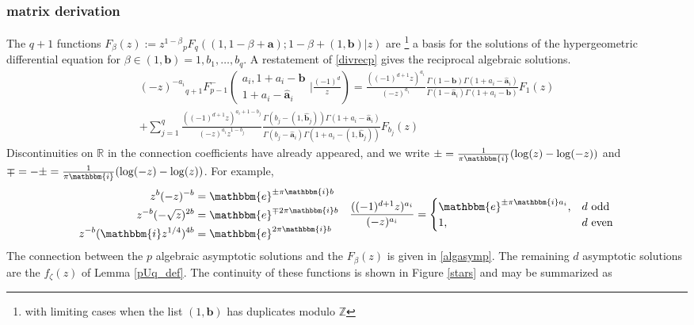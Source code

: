 \documentclass[12pt]{article}
\newcommand{\ee}[0] {\mathbbm{e}}
\newcommand{\ii}[0] {\mathbbm{i}}
\numberwithin{equation}{section}
\newcommand{\FFe}[7] {{}_{#1}^{\,}{#2}_{#3}^{#4} \left( \begin{array}{c} #5 \\ #6 \end{array} \Big| {#7} \right)}
\newcommand{\bfa}[0] {\mathbf{a}}
\newcommand{\bfb}[0] {\mathbf{b}}
\begin{document}
\subsubsection{matrix derivation}
The $q+1$ functions $F_{\beta}(z) := z^{1-\beta} {}_p F_q ( (1,1-\beta+\mathbf{a}); 1-\beta+(1,\mathbf{b}) | z)$ are \footnote{with limiting cases when the list $(1,\bfb)$ has duplicates modulo $\mathbb{Z}$} a basis for the solutions of the hypergeometric differential equation for $\beta \in (1,\bfb) = 1,b_1,\dots,b_q$. A restatement of \eqref{divrecp} gives the reciprocal algebraic solutions.
\begin{equation}
\label{algasymp}
\begin{aligned}
(-z)^{-a_i} \FFe{q+1}{F}{p-1}{-}{a_i,1+a_i-\mathbf{b}}{1+a_i-\hat{\mathbf{a}}_i}{\frac{(-1)^d}{z}} = \frac{((-1)^{d+1}z)^{a_i}}{(-z)^{a_i}}\frac{\Gamma(1-\mathbf{b})\Gamma(1+a_i-\hat{\bfa}_i)}{\Gamma(1-\hat{\bfa}_i) \Gamma(1+a_i-\bfb)} F_{1}(z)\\
+\sum_{j=1}^{q} \frac{((-1)^{d+1} z)^{a_i+1-b_j}}{(-z)^{a_i} z^{1-b_j}} \frac{\Gamma(b_j-(1,\hat{\bfb}_j)) \Gamma(1+a_i-\hat{\bfa}_i)}{\Gamma(b_j-\hat{\bfa}_i)\Gamma(1+a_i-(1,\hat{\bfb}_j))} F_{b_j}(z)
\end{aligned}
\end{equation}
Discontinuities on $\mathbb{R}$ in the connection coefficients have already appeared, and we write $\pm = \tfrac{1}{\pi \ii}(\log(z)-\log(-z))$ and $\mp = - \pm = \tfrac{1}{\pi \ii}(\log(-z)-\log(z))$. For example,
\begin{equation*}
\begin{array}{cc}
\begin{aligned}
z^b (-z)^{-b} &= \ee^{\pm \pi \ii b}\\
z^{-b} (-\sqrt{z})^{2b} &= \ee^{\mp 2 \pi \ii b}\\
z^{-b} (\ii z^{1/4})^{4b} &= \ee^{2 \pi \ii b}\\
\end{aligned}
\quad
\dfrac{((-1)^{d+1}z)^{a_i}}{(-z)^{a_i}} =
\begin{cases}
\ee^{\pm \pi \ii a_i}\text{,} & d \text{ odd}\\
1\text{,} & d \text{ even}
\end{cases}
\end{array}
\end{equation*}
The connection between the $p$ algebraic asymptotic solutions and the $F_{\beta}(z)$ is given in \eqref{algasymp}. The remaining $d$ asymptotic solutions are the $f_{\zeta}(z)$ of Lemma \ref{pUq_def}. The continuity of these functions is shown in Figure \ref{stars} and may be summarized as
\end{document}
